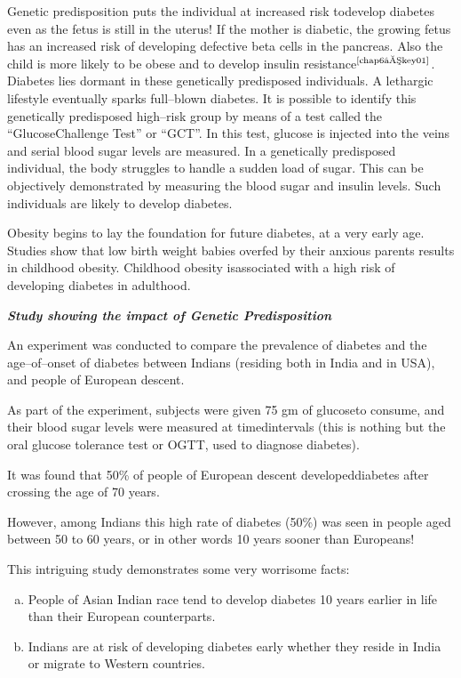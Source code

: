 Genetic predisposition puts the individual at increased risk to\break develop diabetes even as the fetus is still in the uterus! If the mother is diabetic, the growing fetus has an increased risk of developing defe\-ctive beta cells in the pancreas. Also the child is more likely to be obese and to develop insulin resistance$^{\text{\cite{chap6–key01}}}$. Diabetes lies dormant in these genetically predisposed individuals. A lethargic lifestyle eve\-ntually sparks full–blown diabetes. It is possible to identify this genetically predisposed high–risk group by means of a test called the “Glucose\break Challenge Test” or “GCT”. In this test, glucose is injected into the veins and serial blood sugar levels are measured. In a genetically predisposed individual, the body struggles to handle a sudden load of sugar. This can be objectively demonstrated by measuring the blood sugar and insulin levels. Such individuals are likely to develop diabetes.

Obesity begins to lay the foundation for future diabetes, at a very early age. Studies show that low birth weight babies overfed by their anxious parents results in childhood obesity. Childhood obesity is\break associated with a high risk of developing diabetes in adulthood.

\noindent
\textbf{\textit{Study showing the impact of Genetic Predisposition}}

An experiment was conducted to compare the prevalence of diabetes and the age–of–onset of diabetes between Indians (residing both in India and in USA), and people of European descent.

As part of the experiment, subjects were given 75 gm of glucose\break to consume, and their blood sugar levels were measured at timed\break intervals (this is nothing but the oral glucose tolerance test or OGTT, used to diagnose diabetes).

It was found that 50\% of people of European descent developed\break diabetes after crossing the age of 70 years.

However, among Indians this high rate of diabetes (50\%) was seen in people aged between 50 to 60 years, or in other words 10 years sooner than Europeans!

This intriguing study demonstrates some very worrisome facts:

\begin{enumerate}[a)]
\itemsep=0pt
\item People of Asian Indian race tend to develop diabetes 10 years earlier in life than their European counterparts.
\item Indians are at risk of developing diabetes early whether they reside in India or migrate to Western countries.
\end{enumerate}


